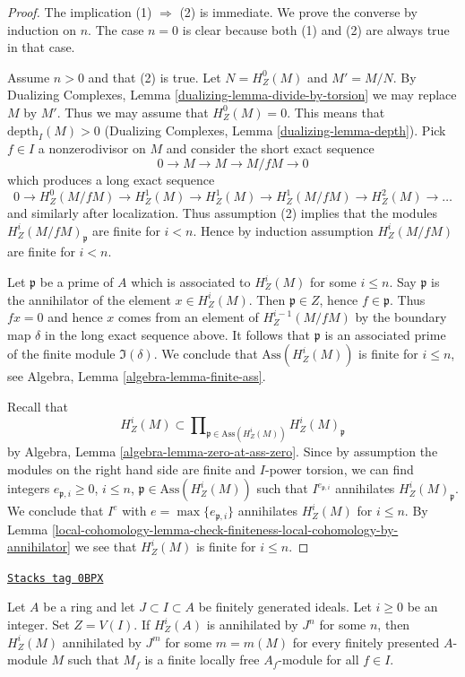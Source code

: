 \begin{proof}
The implication (1) $\Rightarrow$ (2) is immediate. We prove the converse
by induction on $n$. The case $n = 0$ is clear because both (1) and
(2) are always true in that case.

\medskip\noindent
Assume $n > 0$ and that (2) is true. Let $N = H^0_Z(M)$ and $M' = M/N$.
By Dualizing Complexes, Lemma \ref{dualizing-lemma-divide-by-torsion}
we may replace $M$ by $M'$.
Thus we may assume that $H^0_Z(M) = 0$.
This means that $\text{depth}_I(M) > 0$
(Dualizing Complexes, Lemma \ref{dualizing-lemma-depth}).
Pick $f \in I$ a nonzerodivisor on $M$ and consider the short
exact sequence
$$
0 \to M \to M \to M/fM \to 0
$$
which produces a long exact sequence
$$
0 \to H^0_Z(M/fM) \to H^1_Z(M) \to H^1_Z(M) \to H^1_Z(M/fM) \to
H^2_Z(M) \to \ldots
$$
and similarly after localization. Thus assumption (2) implies that
the modules $H^i_Z(M/fM)_\mathfrak p$ are finite for $i < n$. Hence
by induction assumption $H^i_Z(M/fM)$ are finite for $i < n$.

\medskip\noindent
Let $\mathfrak p$ be a prime of $A$ which is associated to
$H^i_Z(M)$ for some $i \leq n$. Say $\mathfrak p$ is the annihilator
of the element $x \in H^i_Z(M)$. Then $\mathfrak p \in Z$, hence
$f \in \mathfrak p$. Thus $fx = 0$ and hence $x$ comes from an
element of $H^{i - 1}_Z(M/fM)$ by the boundary map $\delta$ in the long
exact sequence above. It follows that $\mathfrak p$ is an associated
prime of the finite module $\Im(\delta)$. We conclude that
$\text{Ass}(H^i_Z(M))$ is finite for $i \leq n$, see
Algebra, Lemma \ref{algebra-lemma-finite-ass}.

\medskip\noindent
Recall that
$$
H^i_Z(M) \subset
\prod\nolimits_{\mathfrak p \in \text{Ass}(H^i_Z(M))}
H^i_Z(M)_\mathfrak p
$$
by Algebra, Lemma \ref{algebra-lemma-zero-at-ass-zero}. Since by
assumption the modules on the right hand side are finite and $I$-power
torsion, we can find integers $e_{\mathfrak p, i} \geq 0$, $i \leq n$,
$\mathfrak p \in \text{Ass}(H^i_Z(M))$ such that
$I^{e_{\mathfrak p, i}}$ annihilates $H^i_Z(M)_\mathfrak p$. We conclude
that $I^e$ with $e = \max\{e_{\mathfrak p, i}\}$ annihilates $H^i_Z(M)$
for $i \leq n$. By
Lemma \ref{local-cohomology-lemma-check-finiteness-local-cohomology-by-annihilator}
we see that $H^i_Z(M)$ is finite for $i \leq n$.
\end{proof}

\begin{lemma}
\label{local-cohomology-lemma-annihilate-local-cohomology}
\href{https://stacks.math.columbia.edu/tag/0BPX}{\texttt{Stacks tag 0BPX}}

Let $A$ be a ring and let $J \subset I \subset A$ be finitely generated ideals.
Let $i \geq 0$ be an integer. Set $Z = V(I)$. If
$H^i_Z(A)$ is annihilated by $J^n$ for some $n$, then
$H^i_Z(M)$ annihilated by $J^m$ for some $m = m(M)$
for every finitely presented $A$-module $M$ such that
$M_f$ is a finite locally free $A_f$-module for all $f \in I$.
\end{lemma}

